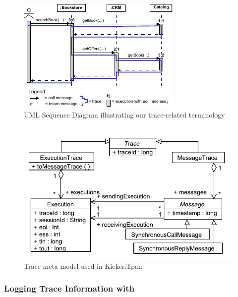 \begin{figure}\centering
\includegraphics[width=0.96\columnwidth]{figures/eoiessBookstoreDemo-extended-2-combined}
\caption{UML Sequence Diagram illustrating our trace-related terminology}
\label{fig:exampleTraceTerminology}
\end{figure}

\begin{figure}\centering
\includegraphics[scale=0.65]{figures/model/kieker_tracemodel}
\caption{Trace meta-model used in Kieker.Tpan}
\label{fig:kiekerTraceRepresentations}
\end{figure}

\subsubsection{Logging Trace Information with \KiekerTpmon{}}

